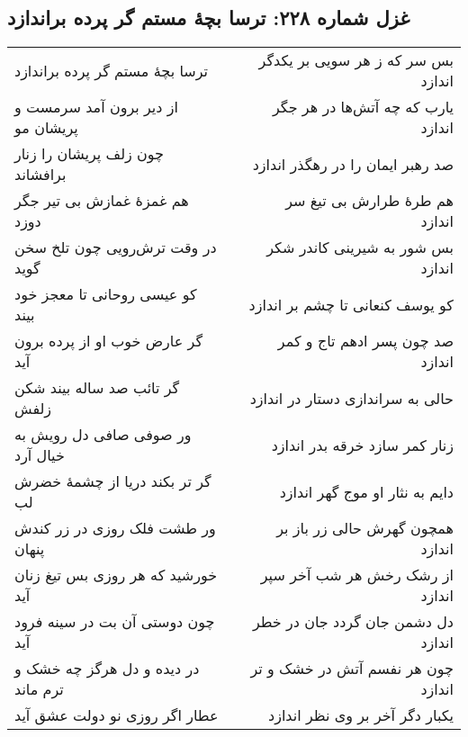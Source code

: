 \begin{center}
\section*{غزل شماره ۲۲۸: ترسا بچهٔ مستم گر پرده براندازد}
\label{sec:228}
\begin{longtable}{l p{0.5cm} r}
ترسا بچهٔ مستم گر پرده براندازد
&&
بس سر که ز هر سویی بر یکدگر اندازد
\\
از دیر برون آمد سرمست و پریشان مو
&&
یارب که چه آتش‌ها در هر جگر اندازد
\\
چون زلف پریشان را زنار برافشاند
&&
صد رهبر ایمان را در رهگذر اندازد
\\
هم غمزهٔ غمازش بی تیر جگر دوزد
&&
هم طرهٔ طرارش بی تیغ سر اندازد
\\
در وقت ترش‌رویی چون تلخ سخن گوید
&&
بس شور به شیرینی کاندر شکر اندازد
\\
کو عیسی روحانی تا معجز خود بیند
&&
کو یوسف کنعانی تا چشم بر اندازد
\\
گر عارض خوب او از پرده برون آید
&&
صد چون پسر ادهم تاج و کمر اندازد
\\
گر تائب صد ساله بیند شکن زلفش
&&
حالی به سراندازی دستار در اندازد
\\
ور صوفی صافی دل رویش به خیال آرد
&&
زنار کمر سازد خرقه بدر اندازد
\\
گر تر بکند دریا از چشمهٔ خضرش لب
&&
دایم به نثار او موج گهر اندازد
\\
ور طشت فلک روزی در زر کندش پنهان
&&
همچون گهرش حالی زر باز بر اندازد
\\
خورشید که هر روزی بس تیغ زنان آید
&&
از رشک رخش هر شب آخر سپر اندازد
\\
چون دوستی آن بت در سینه فرود آید
&&
دل دشمن جان گردد جان در خطر اندازد
\\
در دیده و دل هرگز چه خشک و ترم ماند
&&
چون هر نفسم آتش در خشک و تر اندازد
\\
عطار اگر روزی نو دولت عشق آید
&&
یکبار دگر آخر بر وی نظر اندازد
\\
\end{longtable}
\end{center}
